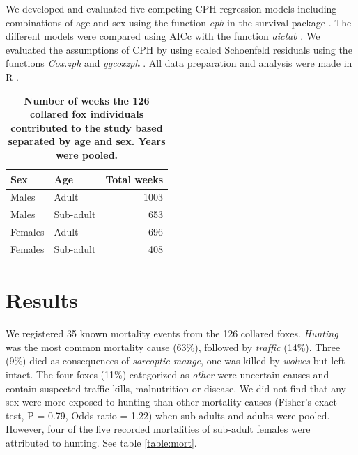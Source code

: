 We developed and evaluated five competing CPH regression models including combinations of age and sex using the function \emph{cph} in the survival package \citep{therneauPackageSurvivalAnalysis2024}. The different models were compared using AICc with the function \emph{aictab} \citep{AICcmodavg-package}. We evaluated the assumptions of CPH by using scaled Schoenfeld residuals using the functions \emph{Cox.zph} and \emph{ggcoxzph} \citep{therneauPackageSurvivalAnalysis2024,kassambaraSurvminerDrawingSurvival2024}. All data preparation and analysis were made in R \citep{rcoreteamLanguageEnvironmentStatistical2024}.

\begin{table}[t]
\centering
\captionsetup{font=small}
\caption{\textbf{Number of weeks the 126 collared fox individuals contributed to the study based separated by age and sex. Years were pooled.}}
\label{table:weeks}
\begin{tabular}{llr}
\toprule
Sex     & Age       & Total weeks \\
\midrule
Males   & Adult     &  1003  \\ 
Males   & Sub-adult  &  653  \\
Females & Adult     &  696  \\
Females & Sub-adult  &  408  \\
\bottomrule
\end{tabular}
\end{table}
                                 
\section*{Results}

We registered 35 known mortality events from the 126 collared foxes. \emph{Hunting} was the most common mortality cause (63\%), followed by \emph{traffic} (14\%). Three (9\%) died as consequences of \emph{sarcoptic mange},  one was killed by \emph{wolves} but left intact. The four foxes (11\%) categorized as \emph{other} were uncertain causes and contain suspected traffic kills, malnutrition or disease. We did not find that any sex were more exposed to hunting than other mortality causes (Fisher's exact test, P = 0.79, Odds ratio = 1.22) when sub-adults and adults were pooled. However, four of the five recorded mortalities of sub-adult females were attributed to hunting. See table \ref{table:mort}. 

